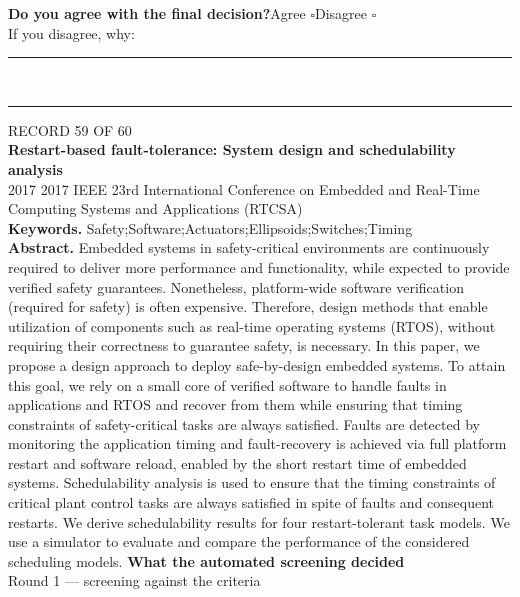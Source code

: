 \documentclass[11pt,a4paper]{article}
\begin{document}
\vspace{2mm}
{\small\textbf{Do you agree with the final decision?}\quad{}Agree $\square$\qquad{}Disagree $\square$}\\[1mm]
{\footnotesize\color{soft}If you disagree, why:}\\[1mm]
\color{rule}\rule{\linewidth}{0.3pt}\\[3mm]\rule{\linewidth}{0.3pt}\color{black}
\clearpage
{\color{soft}\footnotesize RECORD 59 OF 60}\\[1mm]
{\large\bfseries Restart-based fault-tolerance: System design and schedulability analysis}\\[1.5mm]
{\color{soft}\small 2017 \textperiodcentered{} 2017 IEEE 23rd International Conference on Embedded and Real-Time Computing Systems and Applications (RTCSA)}\\[2mm]
{\small\textbf{Keywords.} Safety;Software;Actuators;Ellipsoids;Switches;Timing}\\[2mm]
{\small\textbf{Abstract.} Embedded systems in safety-critical environments are continuously required to deliver more performance and functionality, while expected to provide verified safety guarantees. Nonetheless, platform-wide software verification (required for safety) is often expensive. Therefore, design methods that enable utilization of components such as real-time operating systems (RTOS), without requiring their correctness to guarantee safety, is necessary. In this paper, we propose a design approach to deploy safe-by-design embedded systems. To attain this goal, we rely on a small core of verified software to handle faults in applications and RTOS and recover from them while ensuring that timing constraints of safety-critical tasks are always satisfied. Faults are detected by monitoring the application timing and fault-recovery is achieved via full platform restart and software reload, enabled by the short restart time of embedded systems. Schedulability analysis is used to ensure that the timing constraints of critical plant control tasks are always satisfied in spite of faults and consequent restarts. We derive schedulability results for four restart-tolerant task models. We use a simulator to evaluate and compare the performance of the considered scheduling models.}
\vspace{3mm}
\vspace{2.5mm}
{\small\textbf{What the automated screening decided}}\\[2mm]
{\footnotesize\color{soft}Round 1 --- screening against the criteria}\\[0.5mm]
\end{document}
